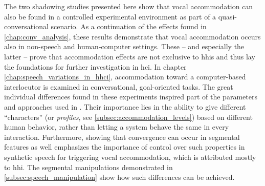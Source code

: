 The two shadowing studies presented here show that vocal accommodation can also be found in a controlled experimental environment as part of a quasi-conversational scenario.
As a continuation of the effects found in \cref{chap:conv_analysis}, these results demonstrate that vocal accommodation occurs also in non-speech and human-computer settings.
These -- and especially the latter -- prove that accommodation effects are not exclusive to \acp{hhi} and thus lay the foundations for further investigation in \ac{hci}.
In chapter \cref{chap:speech_variations_in_hhci}, accommodation toward a computer-based interlocutor is examined in conversational, goal-oriented tasks.
The great individual differences found in these experiments inspired part of the parameters and approaches used in .
Their importance lies in the ability to give different \enquote{characters} (or \emph{profiles}, see \cref{subsec:accommodation_levels}) based on different human behavior, rather than letting a system behave the same in every interaction.
Furthermore, showing that convergence can occur in segmental features as well emphasizes the importance of control over such properties in synthetic speech for triggering vocal accommodation, which is attributed mostly to \ac{hhi}.
The segmental manipulations demonstrated in \cref{subsec:speech_manipulation} show how such differences can be achieved.